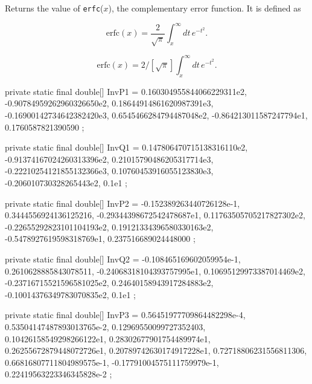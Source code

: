  \begin{tabb}
Returns the value of \texttt{erfc}($x$), the complementary error function.
It is defined as
\begin{latexonly}
\[
\mbox{erfc}(x) = \frac2{\sqrt\pi}\int_x^\infty dt\, e^{-t^2}.
\]
\end{latexonly}
\begin{htmlonly}
\[
\mbox{erfc}(x) = 2/[\sqrt\pi]\int_x^\infty dt\, e^{-t^2}.
\]
\end{htmlonly}
\end{tabb}
\begin{htmlonly}
\end{htmlonly}
\begin{code}\begin{hide}

    private static final double[] InvP1 = {
        0.160304955844066229311e2,
       -0.90784959262960326650e2,
        0.18644914861620987391e3,
       -0.16900142734642382420e3,
        0.6545466284794487048e2,
       -0.864213011587247794e1,
        0.1760587821390590
    };

    private static final double[] InvQ1 = {
        0.147806470715138316110e2,
       -0.91374167024260313396e2,
        0.21015790486205317714e3,
       -0.22210254121855132366e3,
        0.10760453916055123830e3,
       -0.206010730328265443e2,
        0.1e1
    };

    private static final double[] InvP2 = {
       -0.152389263440726128e-1,
        0.3444556924136125216,
       -0.29344398672542478687e1,
        0.11763505705217827302e2,
       -0.22655292823101104193e2,
        0.19121334396580330163e2,
       -0.5478927619598318769e1,
        0.237516689024448000
    };

    private static final double[] InvQ2 = {
      -0.108465169602059954e-1,
       0.2610628885843078511,
      -0.24068318104393757995e1,
       0.10695129973387014469e2,
      -0.23716715521596581025e2,
       0.24640158943917284883e2,
      -0.10014376349783070835e2,
       0.1e1
    };

    private static final double[] InvP3 = {
        0.56451977709864482298e-4,
        0.53504147487893013765e-2,
        0.12969550099727352403,
        0.10426158549298266122e1,
        0.28302677901754489974e1,
        0.26255672879448072726e1,
        0.20789742630174917228e1,
        0.72718806231556811306,
        0.66816807711804989575e-1,
       -0.17791004575111759979e-1,
        0.22419563223346345828e-2
    };


\end{hide}
\end{code}
